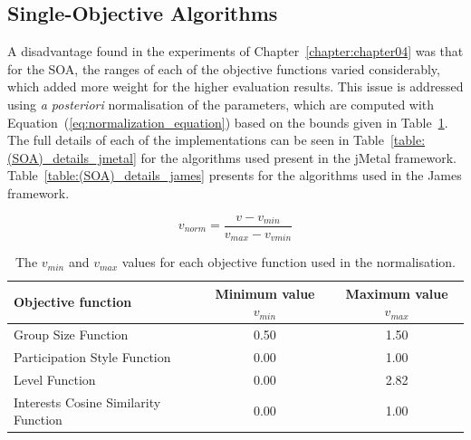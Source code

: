\subsection{Single-Objective Algorithms}
\label{sub:soa_implementation}

A disadvantage found in the experiments of Chapter~\ref{chapter:chapter04} was that for the SOA, the ranges of each of the objective functions varied considerably, which added more weight for the higher evaluation results. This issue is addressed using {\em a posteriori} normalisation of the parameters, which are computed with Equation~(\ref{eq:normalization_equation}) based on the bounds given in Table~\ref{table:normalization_parameters}. \\

The full details of each of the implementations can be seen in Table~\ref{table:(SOA)_details_jmetal} for the algorithms used present in the jMetal framework.  Table~\ref{table:(SOA)_details_james} presents for the algorithms used in the James framework.

\begin{equation}
    v_{norm} = \frac{v- v_{min}}{v_{max} - v_{vmin}} 
    \label{eq:normalization_equation}
\end{equation}

\par
\begin{table}[H]
    \begin{tabular}{lcc}
    \hline
    Objective function & Minimum value $v_{min}$ & Maximum value $v_{max}$ \\
    \hline
    Group Size Function                  & 0.50  & 1.50 \\
    Participation Style Function         & 0.00  & 1.00 \\
    Level Function                       & 0.00  & 2.82 \\
    Interests Cosine Similarity Function & 0.00  & 1.00 \\
    \hline
    \end{tabular}
    \caption{The $v_{min}$ and $v_{max}$ values for each objective function used in the normalisation.}
    \label{table:normalization_parameters}
\end{table}

